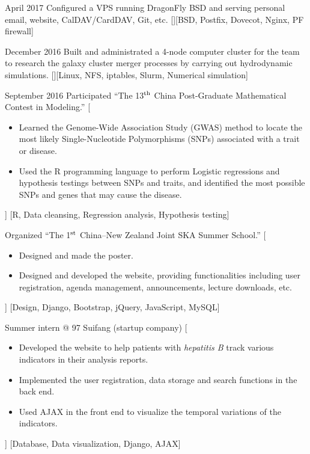 \documentclass{resume}
\begin{document}
\begin{experiences}
  \separator{0.5em}
  \experience
    {April 2017}%
    {Configured a VPS running DragonFly BSD and serving personal email,
      website, CalDAV/CardDAV, Git, etc.}%
    [][BSD, Postfix, Dovecot, Nginx, PF firewall]

  \separator{0.5em}
  \experience
    {December 2016}%
    {Built and administrated a 4-node computer cluster for the team
      to research the galaxy cluster merger processes by carrying out
      hydrodynamic simulations.}%
    [][Linux, NFS, iptables, Slurm, Numerical simulation]


  \separator{0.5em}
  \experience
    {September 2016}%
    {Participated
      \enquote{The 13$^{\rm th}$ China Post-Graduate Mathematical
        Contest in Modeling.}}%
    [\begin{itemize}
      \item Learned the Genome-Wide Association Study (GWAS) method
        to locate the most likely Single-Nucleotide Polymorphisms (SNPs)
        associated with a trait or disease.
      \item Used the R programming language to perform Logistic regressions
        and hypothesis testings between SNPs and traits, and
        identified the most possible SNPs and genes that may cause the
        disease.
    \end{itemize}]%
    [R, Data cleansing, Regression analysis, Hypothesis testing]

  \separator{0.5em}
    {Organized
      \enquote{The 1$^{\rm st}$ China--New Zealand Joint SKA Summer School.}}%
    [\begin{itemize}
      \item Designed and made the poster.
      \item Designed and developed the website,
        providing functionalities including user registration,
        agenda management, announcements, lecture downloads, etc.
    \end{itemize}]%
    [Design, Django, Bootstrap, jQuery, JavaScript, MySQL]

  \separator{0.5em}
    {Summer intern @ 97 Suifang (startup company)}%
    [\begin{itemize}
      \item Developed the website to help patients with \textit{hepatitis B}
        track various indicators in their analysis reports.
      \item Implemented the user registration, data storage and search
        functions in the back end.
      \item Used AJAX in the front end to visualize the temporal variations
        of the indicators.
    \end{itemize}]%
    [Database, Data visualization, Django, AJAX]


\end{experiences}
\end{document}
